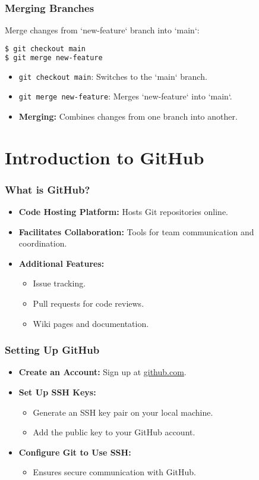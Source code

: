 \documentclass{beamer}
\begin{document}
\begin{frame}[fragile]
  \frametitle{Merging Branches}
  Merge changes from `new-feature` branch into `main`:
  \begin{lstlisting}[language=bash]
$ git checkout main
$ git merge new-feature
  \end{lstlisting}
  \begin{itemize}
    \item \texttt{git checkout main}: Switches to the `main` branch.
    \item \texttt{git merge new-feature}: Merges `new-feature` into `main`.
    \item \textbf{Merging:} Combines changes from one branch into another.
  \end{itemize}
\end{frame}

\section{Introduction to GitHub}

\begin{frame}
  \frametitle{What is GitHub?}
  \begin{itemize}
    \item \textbf{Code Hosting Platform:} Hosts Git repositories online.
    \item \textbf{Facilitates Collaboration:} Tools for team communication and coordination.
    \item \textbf{Additional Features:}
      \begin{itemize}
        \item Issue tracking.
        \item Pull requests for code reviews.
        \item Wiki pages and documentation.
      \end{itemize}
  \end{itemize}
\end{frame}

\begin{frame}
  \frametitle{Setting Up GitHub}
  \begin{itemize}
    \item \textbf{Create an Account:} Sign up at \href{https://github.com}{github.com}.
    \item \textbf{Set Up SSH Keys:}
      \begin{itemize}
        \item Generate an SSH key pair on your local machine.
        \item Add the public key to your GitHub account.
      \end{itemize}
    \item \textbf{Configure Git to Use SSH:}
      \begin{itemize}
        \item Ensures secure communication with GitHub.
      \end{itemize}
  \end{itemize}
\end{frame}
\end{document}
